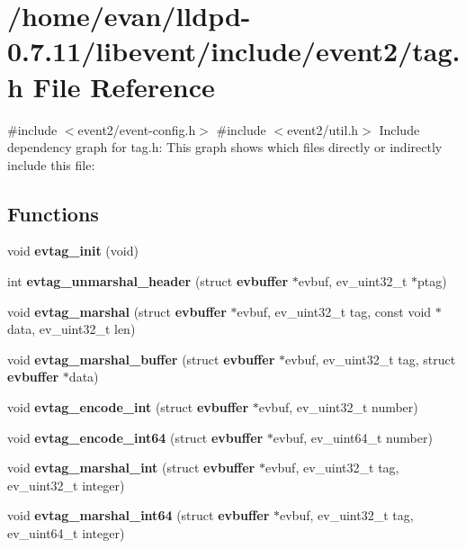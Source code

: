 \section{/home/evan/lldpd-\/0.7.11/libevent/include/event2/tag.h \-File \-Reference}
\label{tag_8h}
{\ttfamily \#include $<$event2/event-\/config.\-h$>$}\*
{\ttfamily \#include $<$event2/util.\-h$>$}\*
\-Include dependency graph for tag.\-h\-:
\-This graph shows which files directly or indirectly include this file\-:
\subsection*{\-Functions}
\begin{DoxyCompactItemize}
\item 
void {\bfseries evtag\-\_\-init} (void)\label{tag_8h_a42029fb85fd8bdbd3d4b0d4fb07eedb1}

\item 
int {\bf evtag\-\_\-unmarshal\-\_\-header} (struct {\bf evbuffer} $\ast$evbuf, ev\-\_\-uint32\-\_\-t $\ast$ptag)
\item 
void {\bfseries evtag\-\_\-marshal} (struct {\bf evbuffer} $\ast$evbuf, ev\-\_\-uint32\-\_\-t tag, const void $\ast$data, ev\-\_\-uint32\-\_\-t len)\label{tag_8h_a323ba1fdf6f2a12f2d0bfbef75d0b2a0}

\item 
void {\bfseries evtag\-\_\-marshal\-\_\-buffer} (struct {\bf evbuffer} $\ast$evbuf, ev\-\_\-uint32\-\_\-t tag, struct {\bf evbuffer} $\ast$data)\label{tag_8h_adcf124d687770ddc83ceb1f1781d5e9a}

\item 
void {\bf evtag\-\_\-encode\-\_\-int} (struct {\bf evbuffer} $\ast$evbuf, ev\-\_\-uint32\-\_\-t number)
\item 
void {\bfseries evtag\-\_\-encode\-\_\-int64} (struct {\bf evbuffer} $\ast$evbuf, ev\-\_\-uint64\-\_\-t number)\label{tag_8h_aace1504f8230e17a77991ad5f130b11b}

\item 
void {\bfseries evtag\-\_\-marshal\-\_\-int} (struct {\bf evbuffer} $\ast$evbuf, ev\-\_\-uint32\-\_\-t tag, ev\-\_\-uint32\-\_\-t integer)\label{tag_8h_af21924dfc97056a88e97221b08e77de4}

\item 
void {\bfseries evtag\-\_\-marshal\-\_\-int64} (struct {\bf evbuffer} $\ast$evbuf, ev\-\_\-uint32\-\_\-t tag, ev\-\_\-uint64\-\_\-t integer)\label{tag_8h_a1aaaa6791a5948b8f26ab62aacc6794d}


\end{DoxyCompactItemize}
